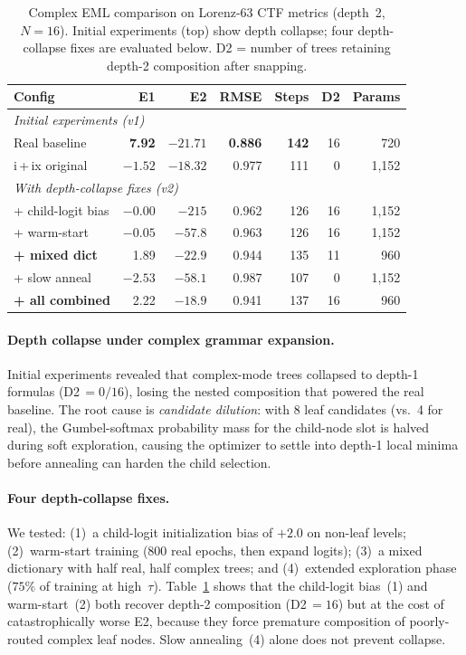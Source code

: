 \documentclass[11pt]{article}
\begin{document}
\begin{table}[t]
\centering
\caption{Complex EML comparison on Lorenz-63 CTF metrics (depth~2,
  $N\!=\!16$). Initial experiments (top) show depth collapse; four
  depth-collapse fixes are evaluated below. D2 = number of trees
  retaining depth-2 composition after snapping.}
\label{tab:complex-eml}
\begin{tabular}{lrrrrrr}
\toprule
Config & E1 & E2 & RMSE & Steps & D2 & Params \\
\midrule
\multicolumn{7}{l}{\emph{Initial experiments (v1)}} \\
Real baseline           &  \textbf{7.92} & $-21.71$ & \textbf{0.886} & \textbf{142} & 16 &   720 \\
i\,+\,ix original      & $-1.52$ & $-18.32$ & 0.977 & 111 &  0 & 1{,}152 \\
\midrule
\multicolumn{7}{l}{\emph{With depth-collapse fixes (v2)}} \\
+ child-logit bias      & $-0.00$ & $-215$ & 0.962 & 126 & 16 & 1{,}152 \\
+ warm-start            & $-0.05$ & $-57.8$ & 0.963 & 126 & 16 & 1{,}152 \\
\textbf{+ mixed dict}   &   1.89  & $-22.9$ & 0.944 & 135 & 11 &   960 \\
+ slow anneal           & $-2.53$ & $-58.1$ & 0.987 & 107 &  0 & 1{,}152 \\
\textbf{+ all combined}  &   2.22  & $\mathbf{-18.9}$ & 0.941 & 137 & 16 & 960 \\
\bottomrule
\end{tabular}
\end{table}

\paragraph{Depth collapse under complex grammar expansion.}
Initial experiments revealed that complex-mode trees collapsed to depth-1
formulas (D2\,$= 0/16$), losing the nested composition that powered the
real baseline.  The root cause is \emph{candidate dilution}: with 8 leaf
candidates (vs.\ 4 for real), the Gumbel-softmax probability mass for the
child-node slot is halved during soft exploration, causing the optimizer
to settle into depth-1 local minima before annealing can harden the child
selection.

\paragraph{Four depth-collapse fixes.}
We tested: (1)~a child-logit initialization bias of $+2.0$ on non-leaf
levels; (2)~warm-start training (800 real epochs, then expand logits);
(3)~a mixed dictionary with half real, half complex trees; and
(4)~extended exploration phase ($75\%$ of training at high~$\tau$).
Table~\ref{tab:complex-eml} shows that the child-logit bias~(1) and
warm-start~(2) both recover depth-2 composition (D2\,$=16$) but at the
cost of catastrophically worse E2, because they force premature
composition of poorly-routed complex leaf nodes.  Slow annealing~(4)
alone does not prevent collapse.
\end{document}
